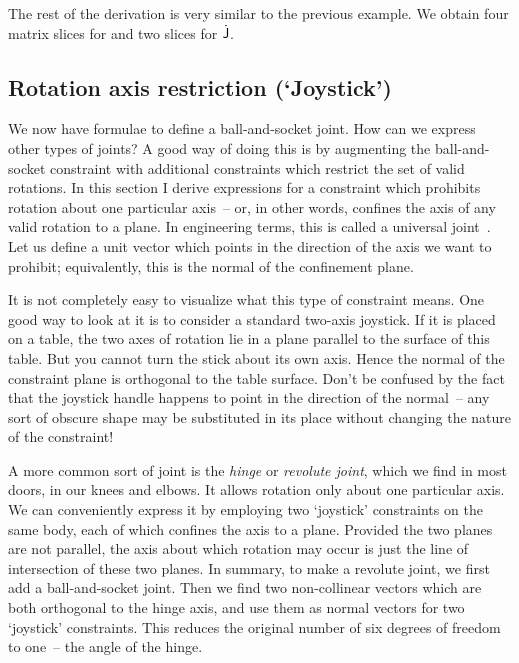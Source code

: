 The rest of the derivation is very similar to the previous example. We obtain four
matrix slices for  and two slices for $\dot{\mathsf{J}}$.


\subsection{Rotation axis restriction (`Joystick')\label{constrJoystick}}

We now have formulae to define a ball-and-socket joint. How can we express other types
of joints? A good way of doing this is by augmenting the ball-and-socket constraint with
additional constraints which restrict the set of valid rotations. In this section I
derive expressions for a constraint which prohibits rotation about one particular axis~--
or, in other words, confines the axis of any valid rotation to a plane. In engineering terms,
this is called a universal joint~\cite{Shabana:01}. Let us define a unit vector  which
points in the direction of the axis we want to prohibit; equivalently, this is the normal of
the confinement plane.

It is not completely easy to visualize what this type of constraint means. One good way to look
at it is to consider a standard two-axis joystick. If it is placed on a table, the two axes of
rotation lie in a plane parallel to the surface of this table. But you cannot turn the stick about
its own axis. Hence the normal of the constraint plane is orthogonal to the table surface.
Don't be confused by the fact that the joystick handle happens to point in the direction of the
normal~-- any sort of obscure shape may be substituted in its place without changing the nature
of the constraint!

A more common sort of joint is the \emph{hinge} or \emph{revolute joint}, which we find in most
doors, in our knees and elbows. It allows rotation only about one particular axis. We can
conveniently express it by employing two `joystick' constraints on the same body, each of which
confines the axis to a plane. Provided the two planes are not parallel, the axis about which
rotation may occur is just the line of intersection of these two planes. In summary, to make a
revolute joint, we first add a ball-and-socket joint. Then we find two non-collinear vectors
which are both orthogonal to the hinge axis, and use them as normal vectors for two `joystick'
constraints. This reduces the original number of six degrees of freedom to one~-- the angle of
the hinge.

